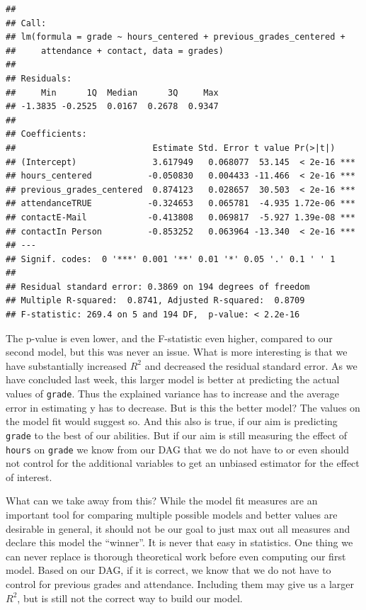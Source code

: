 \documentclass[
]{book}
\begin{document}
\begin{verbatim}
## 
## Call:
## lm(formula = grade ~ hours_centered + previous_grades_centered + 
##     attendance + contact, data = grades)
## 
## Residuals:
##     Min      1Q  Median      3Q     Max 
## -1.3835 -0.2525  0.0167  0.2678  0.9347 
## 
## Coefficients:
##                           Estimate Std. Error t value Pr(>|t|)    
## (Intercept)               3.617949   0.068077  53.145  < 2e-16 ***
## hours_centered           -0.050830   0.004433 -11.466  < 2e-16 ***
## previous_grades_centered  0.874123   0.028657  30.503  < 2e-16 ***
## attendanceTRUE           -0.324653   0.065781  -4.935 1.72e-06 ***
## contactE-Mail            -0.413808   0.069817  -5.927 1.39e-08 ***
## contactIn Person         -0.853252   0.063964 -13.340  < 2e-16 ***
## ---
## Signif. codes:  0 '***' 0.001 '**' 0.01 '*' 0.05 '.' 0.1 ' ' 1
## 
## Residual standard error: 0.3869 on 194 degrees of freedom
## Multiple R-squared:  0.8741, Adjusted R-squared:  0.8709 
## F-statistic: 269.4 on 5 and 194 DF,  p-value: < 2.2e-16
\end{verbatim}

The p-value is even lower, and the F-statistic even higher, compared to our
second model, but this was never an issue. What is more interesting is that we
have substantially increased \(R^2\) and decreased the residual standard error.
As we have concluded last week, this larger model is better at predicting the
actual values of \texttt{grade}. Thus the explained variance has to increase and the
average error in estimating y has to decrease. But is this the better model? The
values on the model fit would suggest so. And this also is true, if our aim is
predicting \texttt{grade} to the best of our abilities. But if our aim is still
measuring the effect of \texttt{hours} on \texttt{grade} we know from our DAG that we do not
have to or even should not control for the additional variables to get an
unbiased estimator for the effect of interest.

What can we take away from this? While the model fit measures are an important
tool for comparing multiple possible models and better values are desirable in
general, it should not be our goal to just max out all measures and declare this
model the ``winner''. It is never that easy in statistics.
One thing we can never replace is thorough theoretical work before even
computing our first model. Based on our DAG, if it is correct, we know that we do not
have to control for previous grades and attendance. Including them may give us a
larger \(R^2\), but is still not the correct way to build our model.
\end{document}
